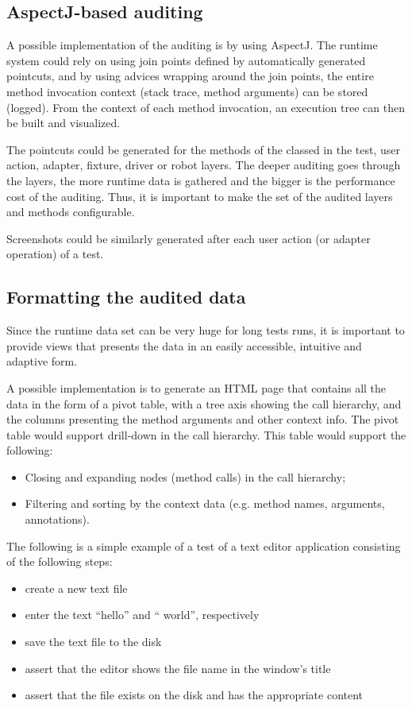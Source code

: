 \subsection {AspectJ-based auditing}

A possible implementation of the auditing is by using AspectJ. The runtime system could rely on using join points defined by automatically generated pointcuts, and by using advices wrapping around the join points, the entire method invocation context (stack trace, method arguments) can be stored (logged). \cite{AOPwiki} From the context of each method invocation, an execution tree can then be built and visualized.

The pointcuts could be generated for the methods of the classed in the test, user action, adapter, fixture, driver or robot layers. The deeper auditing goes through the layers, the more runtime data is gathered and the bigger is the performance cost of the auditing. Thus, it is important to make the set of the audited layers and methods configurable.

Screenshots could be similarly generated after each user action (or adapter operation) of a test.

\subsection {Formatting the audited data}

Since the runtime data set can be very huge for long tests runs, it is important to provide views that presents the data in an easily accessible, intuitive and adaptive form. 

A possible implementation is to generate an HTML page that contains all the data in the form of a pivot table, with a tree axis showing the call hierarchy, and the columns presenting the method arguments and other context info. The pivot table would support drill-down in the call hierarchy. This table would support the following:
\begin{itemize}
\item Closing and expanding nodes (method calls) in the call hierarchy;
\item Filtering and sorting by the context data (e.g. method names, arguments, annotations).
\end{itemize}

The following is a simple example of a test of a text editor application consisting of the following steps:
\begin{itemize}
\item create a new text file
\item enter the text ``hello'' and `` world'', respectively
\item save the text file to the disk
\item assert that the editor shows the file name in the window's title
\item assert that the file exists on the disk and has the appropriate content
\end{itemize}

